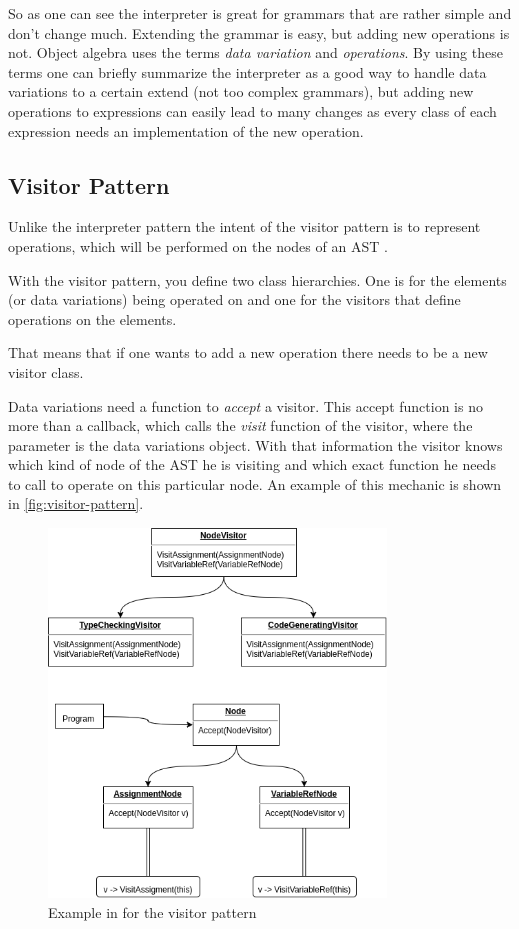 \documentclass{llncs}
\begin{document}
So as one can see the interpreter is great for grammars that are rather simple and don't change much. Extending the grammar is easy, but adding new operations is not. Object algebra uses the terms \emph{data variation} and \emph{operations}. By using these terms one can briefly summarize the interpreter as a good way to handle data variations to a certain extend (not too complex grammars), but adding new operations to expressions can easily lead to many changes as every class of each expression needs an implementation of the new operation.

\subsection{Visitor Pattern} \label{ssec:visitor}
Unlike the interpreter pattern the intent of the visitor pattern is to represent operations, which will be performed on the nodes of an AST \cite{GHJV94}.

With the visitor pattern, you define two class hierarchies. One is for the elements (or data variations) being operated on and one for the visitors that define operations on the elements. \cite{GHJV94}

That means that if one wants to add a new operation there needs to be a new visitor class.

Data variations need a function to \emph{accept} a visitor. This accept function is no more than a callback, which calls the \emph{visit} function of the visitor, where the parameter is the data variations object. With that information the visitor knows which kind of node of the AST he is visiting and which exact function he needs to call to operate on this particular node. An example of this mechanic is shown in \autoref{fig:visitor-pattern}.

\begin{figure}[h]
	\centering
	\includegraphics[width=0.8\textwidth]{img/Visitor-Pattern-Example}
	\caption{Example in \cite{GHJV94} for the visitor pattern}
	\label{fig:visitor-pattern}
\end{figure} 
\end{document}
